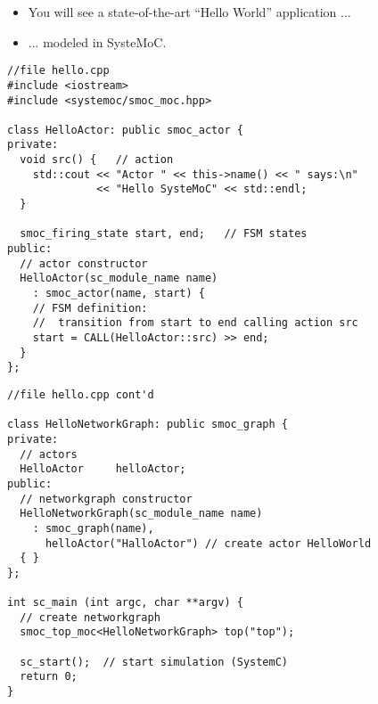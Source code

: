 \begin{frame}
\begin{itemize}
\item You will see a state-of-the-art ``Hello World'' application ...
\item ...  modeled in SysteMoC.
\end{itemize}
\end{frame}




\begin{frame}[fragile=singleslide]
\begin{lstlisting}
//file hello.cpp
#include <iostream>
#include <systemoc/smoc_moc.hpp>

class HelloActor: public smoc_actor {
private:
  void src() {   // action
    std::cout << "Actor " << this->name() << " says:\n"
              << "Hello SysteMoC" << std::endl;
  }

  smoc_firing_state start, end;   // FSM states
public:
  // actor constructor
  HelloActor(sc_module_name name)
    : smoc_actor(name, start) {
    // FSM definition:
    //  transition from start to end calling action src
    start = CALL(HelloActor::src) >> end;
  }
};
\end{lstlisting}
\end{frame}

\begin{frame}[fragile=singleslide]
\begin{lstlisting}
//file hello.cpp cont'd

class HelloNetworkGraph: public smoc_graph {
private:
  // actors
  HelloActor     helloActor;
public:
  // networkgraph constructor
  HelloNetworkGraph(sc_module_name name)
    : smoc_graph(name),
      helloActor("HalloActor") // create actor HelloWorld
  { }
};

int sc_main (int argc, char **argv) {
  // create networkgraph
  smoc_top_moc<HelloNetworkGraph> top("top");

  sc_start();  // start simulation (SystemC)
  return 0;
}
\end{lstlisting}
\end{frame}

